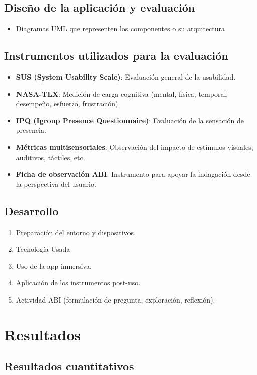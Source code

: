 \documentclass[12pt]{article}
\begin{document}
\subsection{Diseño de la aplicación y evaluación}
\begin{itemize}
    \item Diagramas UML que representen los componentes o su arquitectura
\end{itemize}

\subsection{Instrumentos utilizados para la evaluación}
\begin{itemize}
    \item \textbf{SUS (System Usability Scale)}: Evaluación general de la usabilidad.
    \item \textbf{NASA-TLX}: Medición de carga cognitiva (mental, física, temporal, desempeño, esfuerzo, frustración).
    \item \textbf{IPQ (Igroup Presence Questionnaire)}: Evaluación de la sensación de presencia.
    \item \textbf{Métricas multisensoriales}: Observación del impacto de estímulos visuales, auditivos, táctiles, etc.
    \item \textbf{Ficha de observación ABI}: Instrumento para apoyar la indagación desde la perspectiva del usuario.
\end{itemize}

\subsection{Desarrollo}
\begin{enumerate}
    \item Preparación del entorno y dispositivos.
    \item Tecnología Usada
    \item Uso de la app inmersiva.
    \item Aplicación de los instrumentos post-uso.
    \item Actividad ABI (formulación de pregunta, exploración, reflexión).
\end{enumerate}

\section{Resultados}

\subsection{Resultados cuantitativos}
\end{document}
